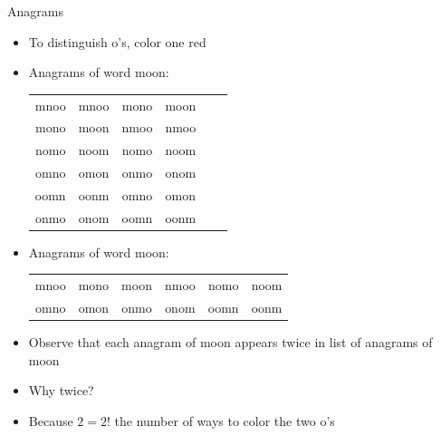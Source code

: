 \documentclass[handout]{beamer}
\theoremstyle{definition}
\begin{document}

\begin{frame}{Anagrams}
\begin{itemize}
\item To distinguish o's, color one red
\item Anagrams of word mo\alert{o}n:
\begin{tabular}{cccccc}
mno\alert{o}&mn\alert{o}o&mon\alert{o}&mo\alert{o}n\\
m\alert{o}no&m\alert{o}on&nmo\alert{o}&nm\alert{o}o\\
nom\alert{o}&no\alert{o}m&n\alert{o}mo&n\alert{o}om\\
omn\alert{o}&om\alert{o}n&onm\alert{o}&on\alert{o}m\\
o\alert{o}mn&o\alert{o}nm&\alert{o}mno&\alert{o}mon\\
\alert{o}nmo&\alert{o}nom&\alert{o}omn&\alert{o}onm
\end{tabular}
\item Anagrams of word \alert{moon}:
\begin{tabular}{cccccc}
mnoo &mono &moon &nmoo &nomo &noom\\
omno &omon &onmo &onom &oomn &oonm 
\end{tabular}
\item Observe that each anagram of moon
appears \alert{twice} in list of anagrams of mo\alert{o}n 
\item Why twice?
\item Because $2=2!$ the number of ways to color the two o's
\end{itemize}
\end{frame}
\end{document}

